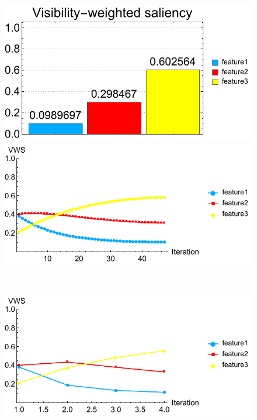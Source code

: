 \begin{figure}
\begin{minipage}{.25\textwidth}
		\subcaption{}
	\end{minipage}~
	\begin{minipage}{.25\textwidth}
		\includegraphics[width=1\linewidth]{figures/tooth_naive_optimized_linesearch_visibility_saliency_weighted_chart}
		\subcaption{}
	\end{minipage}
	
	\begin{minipage}{.49\textwidth}
		\includegraphics[width=1\linewidth]{figures/tooth_naive_saliency_fixed}
		\subcaption{}
	\end{minipage}~
	\begin{minipage}{.49\textwidth}
		\includegraphics[width=1\linewidth]{figures/tooth_naive_saliency_parallelsearch}
		\subcaption{}
	\end{minipage}
	

\end{figure}
